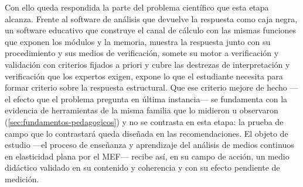Con ello queda respondida la parte del problema científico que esta etapa alcanza. Frente al software de análisis que devuelve la respuesta como caja negra, un software educativo que construye el canal de cálculo con las mismas funciones que exponen los módulos y la memoria, muestra la respuesta junto con su procedimiento y sus medios de verificación, somete su motor a verificación y validación con criterios fijados a priori y cubre las destrezas de interpretación y verificación que los expertos exigen, expone lo que el estudiante necesita para formar criterio sobre la respuesta estructural. Que ese criterio mejore de hecho —el efecto que el problema pregunta en última instancia— se fundamenta con la evidencia de herramientas de la misma familia que lo midieron u observaron (\autoref{sec:fundamentos-pedagogicos}) y no se contrasta en esta etapa: la prueba de campo que lo contrastará queda diseñada en las recomendaciones. El objeto de estudio —el proceso de enseñanza y aprendizaje del análisis de medios continuos en elasticidad plana por el MEF— recibe así, en su campo de acción, un medio didáctico validado en su contenido y coherencia y con su efecto pendiente de medición.
